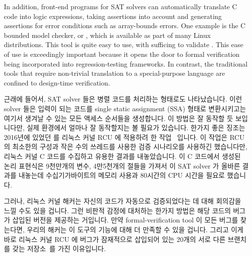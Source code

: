 In addition, front-end programs for SAT solvers can automatically translate
C code into logic expressions, taking assertions into account and generating
assertions for error conditions such as array-bounds errors.
One example is the C bounded model checker, or , which is
available as part of many Linux distributions.
This tool is quite easy to use, with  sufficing to
validate .
This ease of use is exceedingly important because it opens the door
to formal verification being incorporated into regression-testing
frameworks.
In contrast, the traditional tools that require non-trivial translation
to a special-purpose language are confined to design-time verification.
\fi

근래에 들어서, SAT solver 들은 병렬 코드를 처리하는 형태로도 나타났습니다.
이런 solver 들은 입력이 되는 코드를 single static assignment (SSA) 형태로
변환시키고는 여기서 생겨날 수 있는 모든 액세스 순서들을 생성합니다.
이 방법은 잘 동작할 듯 보입니다만, 실제 환경에서 얼마나 잘 동작할지는 볼 필요가
있습니다.
한가지 좋은 징조는 2016년에 있었던  를 리눅스 커널 RCU 에 적용하려 한
작업~\cite{LihaoLiang2016VerifyTreeRCU,LanceRoy2017CBMC-SRCU} 입니다.
이 작업은 RCU 의 최소한의 구성과 작은 수의 쓰레드를 사용한 검증 시나리오를
사용하긴 했습니다만, 리눅스 커널 C 코드를 수집하고 유용한 결과를 내놓았습니다.
이 C 코드에서 생성된 논리 표현식은 9천만개의 변수, 4만5천개의 절들을 가져서 이
SAT solver 가 올바른 결과를 내놓는데 수십기가바이트의 메모리 사용과 80시간의
CPU 시간을 필요로 했습니다.
\iffalse

More recently, SAT solvers have appeared that handle parallel code.
These solvers operate by converting the input code into single static
assignment (SSA) form, then generating all permitted access orders.
This approach seems promising, but it remains to be seen how well
it works in practice.
One encouraging sign is work in 2016 applying \co{cbmc} to Linux-kernel
RCU~\cite{LihaoLiang2016VerifyTreeRCU,LanceRoy2017CBMC-SRCU}.
This work used minimal configurations of RCU, and verified scenarios
using small numbers of threads, but nevertheless successfully ingested
Linux-kernel C code and produced a useful result.
The logic expressions generated from the C code had up to 90~million
variables, 450~million clauses, occupied tens of gigabytes of memory,
and required up to 80~hours of CPU time for the SAT solver to produce
the correct result.
\fi

그러나, 리눅스 커널 해커는 자신의 코드가 자동으로 검증되었다는 데 대해 회의감을
느낄 수도 있을 겁니다.
그런 비판적 감정에 대처하는 한가지 방법은 해당 코드의 버그가 삽입된 버전을
제공하는 거입니다.
만약 formal-verification tool 이 모든 버그를 찾는다면, 우리의 해커는 이 도구의
기능에 대해 더 만족할 수 있을 겁니다.
그리고 이게 바로 리눅스 커널 RCU 에 버그가 잠재적으로 삽입되어 있는 20개의 서로
다른 브랜치를 갖는 
저장소~\cite{PaulEMcKenney2017VerificationChallenge6}를 가진 이유입니다.

